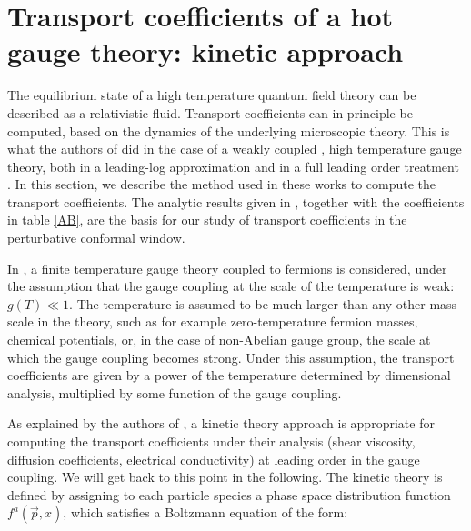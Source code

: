 
\section{Transport coefficients of a hot gauge theory: kinetic approach}

The equilibrium state of a high temperature quantum field theory can be described as a relativistic fluid. Transport coefficients can in principle be computed, based on the dynamics of the underlying microscopic theory.
This is what the authors of \cite{Arnold:2000dr,Arnold:2003zc} did in the case of a weakly coupled , high temperature gauge theory, both in a leading-log approximation \cite{Arnold:2000dr} and in a full leading order treatment \cite{Arnold:2003zc}.
In this section, we describe the method used in these works to compute the transport coefficients. The analytic results given in \cite{Arnold:2000dr}, together with the coefficients in table \ref{AB}, are the basis for our study of transport coefficients in the perturbative conformal window.

In \cite{Arnold:2000dr,Arnold:2003zc}, a finite temperature gauge theory coupled to fermions is considered, under the assumption that the gauge coupling at the scale of the temperature is weak: $g(T) \ll 1$. The temperature is assumed to be much larger than any other mass scale in the theory, such as for example zero-temperature fermion masses, chemical potentials, or, in the case of non-Abelian gauge group, the scale at which the gauge coupling becomes strong. Under this assumption, the transport coefficients are given by a power of the temperature determined by dimensional analysis, multiplied by some function of the gauge coupling.

As explained by the authors of \cite{Arnold:2000dr,Arnold:2003zc}, a kinetic theory approach is appropriate for computing the transport coefficients under their analysis (shear viscosity, diffusion coefficients, electrical conductivity) at leading order in the gauge coupling. We will get back to this point in the following. The kinetic theory is defined by assigning to each particle species a phase space distribution function $f^a(\vec p, x)$, which satisfies a Boltzmann equation of the form:

